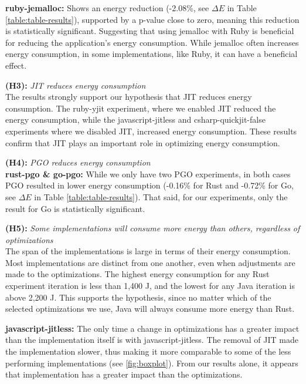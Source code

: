 \documentclass[main.tex]{subfiles}
\begin{document}
\textbf{ruby-jemalloc:} Shows an energy reduction (-2.08\%, see $\Delta E$ in Table \ref{table:table-results}), supported by a p-value close to zero, meaning this reduction is statistically significant. Suggesting that using jemalloc with Ruby is beneficial for reducing the application's energy consumption. While jemalloc often increases energy consumption, in some implementations, like Ruby, it can have a beneficial effect.

\textbf{(H3):} \emph{JIT reduces energy consumption}
\\
The results strongly support our hypothesis that JIT reduces energy consumption. The ruby-yjit experiment, where we enabled JIT reduced the energy consumption, while the javascript-jitless and csharp-quickjit-false experiments where we disabled JIT, increased energy consumption. These results confirm that JIT plays an important role in optimizing energy consumption.

\textbf{(H4):} \emph{PGO reduces energy consumption}
\\
\textbf{rust-pgo \& go-pgo:} While we only have two PGO experiments, in both cases PGO resulted in lower energy consumption (-0.16\% for Rust and -0.72\% for Go, see $\Delta E$ in Table \ref{table:table-results}). That said, for our experiments, only the result for Go is statistically significant.

\textbf{(H5):} \emph{Some implementations will consume more energy than others, regardless of optimizations}
\\
The span of the implementations is large in terms of their energy consumption. Most implementations are distinct from one another, even when adjustments are made to the optimizations. The highest energy consumption for any Rust experiment iteration is less than 1,400 J, and the lowest for any Java iteration is above 2,200 J. This supports the hypothesis, since no matter which of the selected optimizations we use, Java will always consume more energy than Rust.

\textbf{javascript-jitless:} The only time a change in optimizations has a greater impact than the implementation itself is with javascript-jitless. The removal of JIT made the implementation slower, thus making it more comparable to some of the less performing implementations (see \ref{fig:boxplot}). From our results alone, it appears that implementation has a greater impact than the optimizations. 
\end{document}
